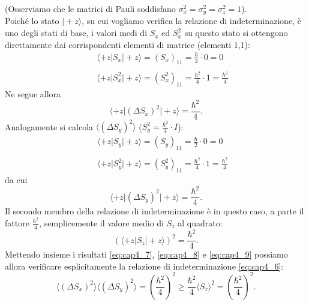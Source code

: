 \documentclass[a4paper,12pt,oneside]{book}
\begin{document}
(Osserviamo che le matrici di Pauli soddisfano $\sigma _x ^2 = \sigma _y ^2 = \sigma _z ^2 =1$).\\
Poiché lo stato $\vert +z \rangle$, su cui vogliamo verifica la relazione di indeterminazione, è uno degli stati di base, i valori medi di $S_x$ ed $S_x ^2$ su questo stato si ottengono direttamente dai corrispondenti elementi di matrice (elementi 1,1):
\begin{eqnarray}
& &\displaystyle{\langle +z \vert S_x \vert +z \rangle = (S_x)_{11} = \frac{\hbar}{2}\cdot 0 =0}  \nonumber \\
\\
& &\displaystyle{\langle +z \vert S_x ^2\vert +z \rangle = (S_x ^2)_{11} = \frac{\hbar ^2}{4}\cdot 1 =\frac{\hbar ^2}{4}} \nonumber
\end{eqnarray}
Ne segue allora
\begin{equation}
\label{eq:cap4_7}
\langle +z \vert (\Delta S_x)^2\vert +z \rangle = \frac{\hbar ^2}{4}.
\end{equation}
Analogamente si calcola $\langle (\Delta S_y)^2 \rangle $ ($S_y ^2= \frac{\hbar ^2}{4}\cdot I$):
\begin{eqnarray}
& &\displaystyle{\langle +z \vert S_y \vert +z \rangle = (S_y)_{11} = \frac{\hbar}{2}\cdot 0 =0}  \nonumber \\
\\
& &\displaystyle{\langle +z \vert S_y ^2\vert +z \rangle = (S_y ^2)_{11} = \frac{\hbar ^2}{4}\cdot 1 =\frac{\hbar ^2}{4}} \nonumber
\end{eqnarray}
da cui
\begin{equation}
\label{eq:cap4_8}
\langle +z \vert (\Delta S_y)^2\vert +z \rangle = \frac{\hbar ^2}{4}.
\end{equation}
Il secondo membro della relazione di indeterminazione è in questo caso, a parte il fattore $\frac{\hbar ^2}{4}$, semplicemente il valore medio di $S_z$ al quadrato:
\begin{equation}
\label{eq:cap4_9}
\left( \langle +z \vert S_z \vert +z \rangle \right) ^2 = \frac{\hbar ^2}{4}.
\end{equation}
Mettendo insieme i risultati \eqref{eq:cap4_7}, \eqref{eq:cap4_8} e \eqref{eq:cap4_9} possiamo allora verificare esplicitamente la relazione di indeterminazione \eqref{eq:cap4_6}:
\begin{equation}
\langle  (\Delta S_x)^2 \rangle \langle(\Delta S_y)^2 \rangle = \left(\frac{\hbar ^2}{4} \right) ^2 \geq \frac{\hbar ^2}{4} \langle S_z  \rangle ^2 = \left(\frac{\hbar ^2}{4} \right) ^2.
\end{equation}
\end{document}
